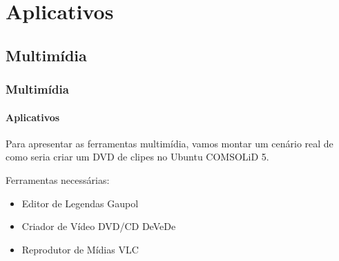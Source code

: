 \section{Aplicativos}

\begin{frame}


\end{frame}

\subsection{Multimídia}

\begin{frame}


\end{frame}

\begin{frame}\frametitle{Multimídia}\framesubtitle{Aplicativos}

Para apresentar as ferramentas multimídia, vamos montar um cenário real de como
seria criar um DVD de clipes no Ubuntu COMSOLiD 5.

Ferramentas necessárias:
\begin{itemize}
	\item Editor de Legendas Gaupol
	\item Criador de Vídeo DVD/CD DeVeDe
	\item Reprodutor de Mídias VLC
\end{itemize}

\end{frame}

